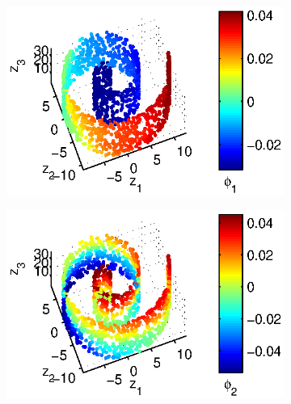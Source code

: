 \begin{figure}[!t]
\begin{subfigure}{0.25\textwidth}
\caption{}
\label{subfig:swissroll1_evals}
\end{subfigure}
%
\begin{subfigure}{0.25\textwidth}
\centering
\includegraphics[width=\textwidth]{swissroll1_color1}
\caption{}
\label{subfig:swissroll1_color1}
\end{subfigure}
%
\begin{subfigure}{0.25\textwidth}
\centering
\includegraphics[width=\textwidth]{swissroll1_color2}
\caption{}
\label{subfig:swissroll1_color2}
\end{subfigure}


\end{figure}
